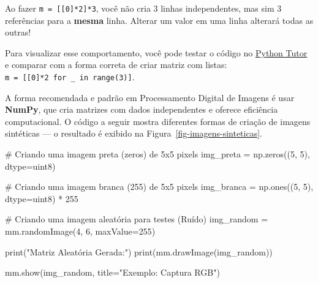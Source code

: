 \documentclass[
  portuguese,
  letterpaper,
  openany,
  oneside,
  12pt,
  a4paper]{book}
\newenvironment{Shaded}{\begin{snugshade}}{\end{snugshade}}
\newcommand{\BuiltInTok}[1]{\textcolor[rgb]{0.00,0.23,0.31}{#1}}
\newcommand{\CommentTok}[1]{\textcolor[rgb]{0.37,0.37,0.37}{#1}}
\newcommand{\DecValTok}[1]{\textcolor[rgb]{0.68,0.00,0.00}{#1}}
\newcommand{\NormalTok}[1]{\textcolor[rgb]{0.00,0.23,0.31}{#1}}
\newcommand{\OperatorTok}[1]{\textcolor[rgb]{0.37,0.37,0.37}{#1}}
\newcommand{\StringTok}[1]{\textcolor[rgb]{0.13,0.47,0.30}{#1}}
\begin{document}
\begin{tcolorbox}[enhanced jigsaw, colframe=quarto-callout-warning-color-frame, opacitybacktitle=0.6, coltitle=black, rightrule=.15mm, bottomrule=.15mm, arc=.35mm, toprule=.15mm, breakable, opacityback=0, colbacktitle=quarto-callout-warning-color!10!white, left=2mm, title=\textcolor{quarto-callout-warning-color}{\faExclamationTriangle}\hspace{0.5em}{Atenção à cópia de referências}, bottomtitle=1mm, toptitle=1mm, titlerule=0mm, leftrule=.75mm, colback=white]

Ao fazer \texttt{m\ =\ {[}{[}0{]}*2{]}*3}, você não cria 3 linhas
independentes, mas sim 3 referências para a \textbf{mesma} linha.
Alterar um valor em uma linha alterará todas as outras!

\end{tcolorbox}

Para visualizar esse comportamento, você pode testar o código no
\href{https://pythontutor.com/}{Python Tutor} e comparar com a forma
correta de criar matriz com listas:
\texttt{m\ =\ {[}{[}0{]}*2\ for\ \_\ in\ range(3){]}}.

A forma recomendada e padrão em Processamento Digital de Imagens é usar
\textbf{NumPy}, que cria matrizes com dados independentes e oferece
eficiência computacional. O código a seguir mostra diferentes formas de
criação de imagens sintéticas --- o resultado é exibido na
Figura~\ref{fig-imagens-sinteticas}.

\begin{Shaded}
\begin{Highlighting}[]
\CommentTok{\# Criando uma imagem preta (zeros) de 5x5 pixels}
\NormalTok{img\_preta }\OperatorTok{=}\NormalTok{ np.zeros((}\DecValTok{5}\NormalTok{, }\DecValTok{5}\NormalTok{), dtype}\OperatorTok{=}\StringTok{\textquotesingle{}uint8\textquotesingle{}}\NormalTok{)}

\CommentTok{\# Criando uma imagem branca (255) de 5x5 pixels}
\NormalTok{img\_branca }\OperatorTok{=}\NormalTok{ np.ones((}\DecValTok{5}\NormalTok{, }\DecValTok{5}\NormalTok{), dtype}\OperatorTok{=}\StringTok{\textquotesingle{}uint8\textquotesingle{}}\NormalTok{) }\OperatorTok{*} \DecValTok{255}

\CommentTok{\# Criando uma imagem aleatória para testes (Ruído)}
\NormalTok{img\_random }\OperatorTok{=}\NormalTok{ mm.randomImage(}\DecValTok{4}\NormalTok{, }\DecValTok{6}\NormalTok{, maxValue}\OperatorTok{=}\DecValTok{255}\NormalTok{)}

\BuiltInTok{print}\NormalTok{(}\StringTok{"Matriz Aleatória Gerada:"}\NormalTok{)}
\BuiltInTok{print}\NormalTok{(mm.drawImage(img\_random))}

\NormalTok{mm.show(img\_random, title}\OperatorTok{=}\StringTok{"Exemplo: Captura RGB"}\NormalTok{)}
\end{Highlighting}
\end{Shaded}
\end{document}
